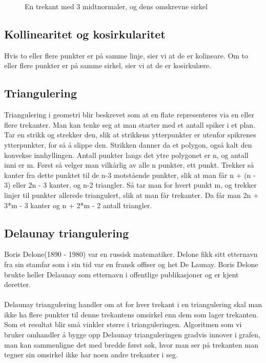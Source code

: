 \documentclass[norsk]{article}
\begin{document}
\begin{figure}
\centering
{}
\caption{En trekant med 3 midtnormaler, og dens omskrevne sirkel}
\label{trekant}
\end{figure}

\subsection{Kollinearitet og kosirkularitet}
Hvis to eller flere punkter er på samme linje, sier vi at de
er kolineare. Om to eller flere punkter er på samme sirkel, sier
vi at de er kosirkulære.

\subsection{Triangulering}
Triangulering i geometri blir beskrevet som at en flate
representeres via en eller flere trekanter. Man kan tenke seg at man
starter med et antall spiker i et plan. Tar en strikk og strekker
den, slik at strikkens ytterpunkter er utenfor spikrenes ytterpunkter, for så
å slippe den. Strikken danner da et polygon, også kalt den konvekse
innhyllingen. Antall punkter langs det ytre polygonet er n, og antall inni er m.
Først så velger man vilkårlig av alle n punkter, ett punkt. Trekker så
kanter fra dette punktet til de n-3 motstående punkter, slik at man
får n + (n - 3) eller 2n - 3 kanter, og n-2 triangler. Så tar man for
hvert punkt m, og trekker linjer til punkter allerede triangulert,
slik at man får trekanter. Da får man 2n + 3*m - 3 kanter og n + 2*m -
2 antall triangler.

\subsection{Delaunay triangulering}
Boris Delone(1890 - 1980) var en russisk matematiker.  Delone fikk
sitt etternavn fra sin stamfar som i sin tid var en fransk offiser og
het De Launay. Boris Delone brukte heller Delaunay som etternavn i
offentlige publikasjoner og er kjent deretter.
\\\\
Delaunay triangulering handler om at for hver trekant i en triangulering 
skal man ikke ha flere punkter til denne trekantens omsirkel enn dem som
lager trekanten.
Som et resultat blir små vinkler større i trianguleringen.
Algoritmen som vi bruker omhandler å bygge opp Delaunay trianguleringen 
gradvis innover i grafen, man kan sammenligne det med 
bredde først søk, hvor man ser på trekanten man tegner sin omsirkel ikke har
noen andre trekanter i seg.
\end{document}
